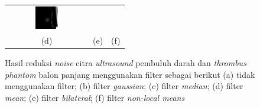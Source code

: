 {\begin{figure}[htbp]
\begin{tabular}{ccc}
			\includegraphics[width=0.3\textwidth]{bab3/reduksi_noise/img_360_nlm.png} \\
			(d)  & (e)  & (f)  %
		\end{tabular}
	\caption{Hasil reduksi \textit{noise} citra \textit{ultrasound} pembuluh darah dan \textit{thrombus} \textit{phantom} balon panjang menggunakan filter sebagai berikut (a) tidak menggunakan filter; (b) filter \textit{gaussian}; (c) filter \textit{median}; (d) filter \textit{mean}; (e) filter \textit{bilateral}; (f) filter \textit{non-local means}}
	\label{fig:hasil_denoising_rekonstruksi}
\end{figure}


}
